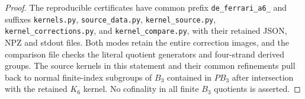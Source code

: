 \begin{proof}
The reproducible certificates have common prefix
\texttt{de\_ferrari\_a6\_} and suffixes
\texttt{kernels.py}, \texttt{source\_data.py},
\texttt{kernel\_source.py},
\texttt{kernel\_corrections.py}, and
\texttt{kernel\_compare.py}, with their
retained JSON, NPZ and stdout files.  Both modes retain the
entire correction images, and the comparison file checks the
literal quotient generators and four-strand derived groups.
The source kernels in this statement and their common
refinements pull back to normal finite-index subgroups of
$B_3$ contained in $PB_3$ after intersection with the retained
$K_6$ kernel.  No cofinality in all finite $B_3$ quotients is
asserted.
\end{proof}
